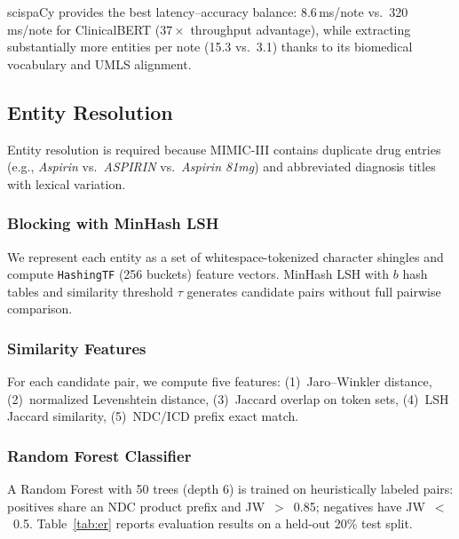 \documentclass[conference]{IEEEtran}
\begin{document}
scispaCy provides the best latency--accuracy balance: 8.6\,ms/note
vs.\ 320\,ms/note for ClinicalBERT ($37\times$ throughput advantage),
while extracting substantially more entities per note (15.3 vs.\ 3.1)
thanks to its biomedical vocabulary and UMLS alignment.

\subsection{Entity Resolution}

Entity resolution is required because MIMIC-III contains duplicate drug entries
(e.g., \textit{Aspirin} vs.\ \textit{ASPIRIN} vs.\ \textit{Aspirin 81mg})
and abbreviated diagnosis titles with lexical variation.

\subsubsection{Blocking with MinHash LSH}

We represent each entity as a set of whitespace-tokenized character shingles
and compute \texttt{HashingTF} (256 buckets) feature vectors.
MinHash LSH with $b$ hash tables and similarity threshold $\tau$ generates
candidate pairs without full pairwise comparison.

\subsubsection{Similarity Features}

For each candidate pair, we compute five features:
(1)~Jaro--Winkler distance,
(2)~normalized Levenshtein distance,
(3)~Jaccard overlap on token sets,
(4)~LSH Jaccard similarity,
(5)~NDC/ICD prefix exact match.

\subsubsection{Random Forest Classifier}

A Random Forest with 50 trees (depth 6) is trained on heuristically labeled
pairs: positives share an NDC product prefix and JW~$>$~0.85; negatives have
JW~$<$~0.5. Table~\ref{tab:er} reports evaluation results on a held-out 20\%
test split.
\end{document}
